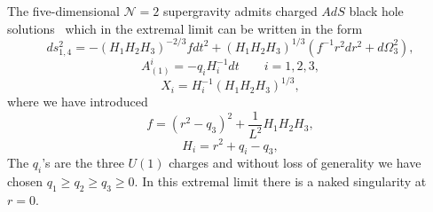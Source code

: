 \documentclass[a4paper,12pt]{article}
\begin{document}
The five-dimensional $\mathcal{N}=2$ supergravity admits charged $AdS$ black
hole solutions~\cite{Behrndt:1998ns, Behrndt:1998jd} which in the extremal
limit can be written in the form
\begin{equation}
\label{chargedbh1}
ds^2_{1,4} = -(H_1 H_2 H_3)^{-2/3} f dt^{2} + (H_1 H_2 H_3)^{1/3}
(f^{-1} r^2 dr^{2} + d\Omega_3^2),
\end{equation}
\begin{equation}
\label{chargedbh2}
A_{(1)}^{i} = -q_i H_i^{-1} dt \qquad i=1,2,3,
\end{equation}
\begin{equation}
\label{chargedbh3}
X_{i} = H_i^{-1} (H_1 H_2 H_3)^{1/3},
\end{equation}
where we have introduced
\begin{equation}
f = (r^2 - q_3)^2 + \frac{1}{L^2}{H_1 H_2 H_3},
\end{equation}
\begin{equation}
H_i = r^2 + q_i - q_3,
\end{equation}
The $q_{i}$'s are the three $U(1)$ charges and without
loss of generality we have chosen $q_1 \ge q_2 \ge q_3 \ge 0$. In this extremal
limit there is a naked singularity at $r=0$.
\end{document}
